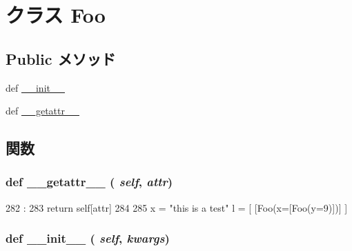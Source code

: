 \hypertarget{classm5_1_1util_1_1code__formatter_1_1Foo}{
\section{クラス Foo}
\label{classm5_1_1util_1_1code__formatter_1_1Foo}
}
\subsection*{Public メソッド}
\begin{DoxyCompactItemize}
\item 
def \hyperlink{classm5_1_1util_1_1code__formatter_1_1Foo_ac775ee34451fdfa742b318538164070e}{\_\-\_\-init\_\-\_\-}
\item 
def \hyperlink{classm5_1_1util_1_1code__formatter_1_1Foo_a0a990b3ec3889d40889daca9ee5e4695}{\_\-\_\-getattr\_\-\_\-}
\end{DoxyCompactItemize}


\subsection{関数}
\hypertarget{classm5_1_1util_1_1code__formatter_1_1Foo_a0a990b3ec3889d40889daca9ee5e4695}{
\subsubsection[{\_\-\_\-getattr\_\-\_\-}]{\setlength{\rightskip}{0pt plus 5cm}def \_\-\_\-getattr\_\-\_\- ( {\em self}, \/   {\em attr})}}
\label{classm5_1_1util_1_1code__formatter_1_1Foo_a0a990b3ec3889d40889daca9ee5e4695}



\begin{DoxyCode}
282                                    :
283             return self[attr]
284 
285     x = "this is a test"
    l = [ [Foo(x=[Foo(y=9)])] ]
\end{DoxyCode}
\hypertarget{classm5_1_1util_1_1code__formatter_1_1Foo_ac775ee34451fdfa742b318538164070e}{
\subsubsection[{\_\-\_\-init\_\-\_\-}]{\setlength{\rightskip}{0pt plus 5cm}def \_\-\_\-init\_\-\_\- ( {\em self}, \/   {\em kwargs})}}
\label{classm5_1_1util_1_1code__formatter_1_1Foo_ac775ee34451fdfa742b318538164070e}



